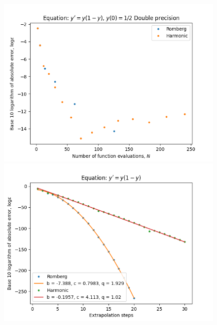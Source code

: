 \begin{figure}[H]
\centering
\begin{minipage}{0.45\textwidth}
\centering
\includegraphics[scale=0.45]{emr_plots/logistic.png}
\end{minipage}
\begin{minipage}{0.45\textwidth}
\centering
\includegraphics[scale=0.45]{emr_plots/logistic_hp_steps.png}
\end{minipage}
\end{figure}

